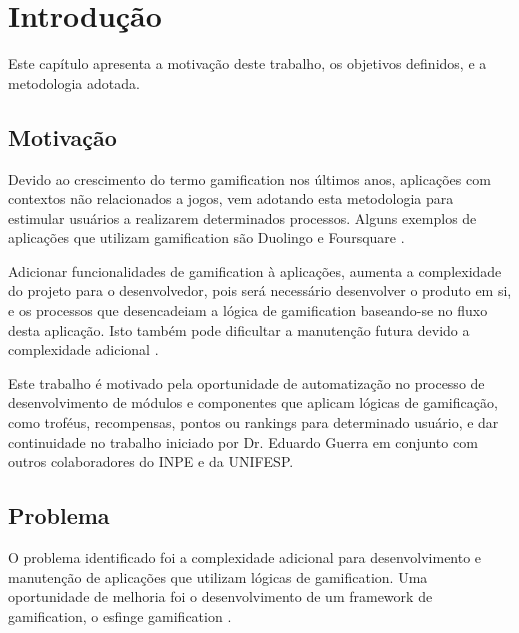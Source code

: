 \chapter[Introdução]{Introdução}
\par Este capítulo apresenta a motivação deste trabalho, os objetivos definidos, e a metodologia adotada.

\section{Motivação}

\par Devido ao crescimento do termo gamification nos últimos anos, \cite{groh2012gamification} aplicações com contextos não relacionados a jogos, vem adotando esta metodologia para estimular usuários a realizarem determinados processos. Alguns exemplos de aplicações que utilizam gamification são Duolingo \cite{melo2016eficiencia} e Foursquare \cite{huotari2012defining}.

\par Adicionar funcionalidades de gamification à aplicações, aumenta a complexidade do projeto para o desenvolvedor, pois será necessário desenvolver o produto em si, e os processos que desencadeiam a lógica de gamification baseando-se no fluxo desta aplicação. Isto também pode dificultar a manutenção futura devido a complexidade adicional \cite{guerra2017approach}.

\par Este trabalho é motivado pela oportunidade de automatização no processo de desenvolvimento de módulos e componentes que aplicam lógicas de gamificação, como troféus, recompensas, pontos ou rankings para determinado usuário, e dar continuidade no trabalho iniciado por Dr. Eduardo Guerra em conjunto com outros colaboradores do INPE e da UNIFESP.

\section{Problema}

\par O problema identificado foi a complexidade adicional para desenvolvimento e manutenção de aplicações que utilizam lógicas de gamification. Uma oportunidade de melhoria foi o desenvolvimento de um framework de gamification, o esfinge gamification \cite{guerra2017approach}.

